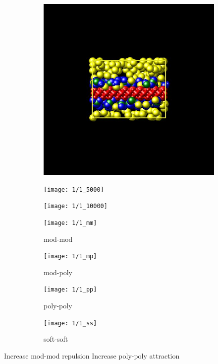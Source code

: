 \documentclass[a4paper]{article}
\begin{document}
\begin{figure}[H]
\begin{subfigure}{0.3\textwidth}
  \centering
  \includegraphics[width=\linewidth,keepaspectratio]{start}
  \caption{}
\end{subfigure}
\begin{subfigure}{0.3\textwidth}
  \centering
  \texttt{[image: 1/1\_5000]}
  \caption{}
\end{subfigure}
\begin{subfigure}{0.3\textwidth}
  \centering
  \texttt{[image: 1/1\_10000]}
  \caption{}
\end{subfigure}
\caption{}
\label{fig_1}
\end{figure}

\begin{figure}[H]
\begin{subfigure}{0.24\textwidth}
  \centering
  \texttt{[image: 1/1\_mm]}
  \caption{mod-mod}
\end{subfigure}
\begin{subfigure}{0.24\textwidth}
  \centering
  \texttt{[image: 1/1\_mp]}
  \caption{mod-poly}
\end{subfigure}
\begin{subfigure}{0.24\textwidth}
  \centering
  \texttt{[image: 1/1\_pp]}
  \caption{poly-poly}
\end{subfigure}
\begin{subfigure}{0.24\textwidth}
  \centering
  \texttt{[image: 1/1\_ss]}
  \caption{soft-soft}
\end{subfigure}
\caption{}
\label{fig_1}
\end{figure}
Increase mod-mod repulsion\newline
Increase poly-poly attraction
\end{document}

